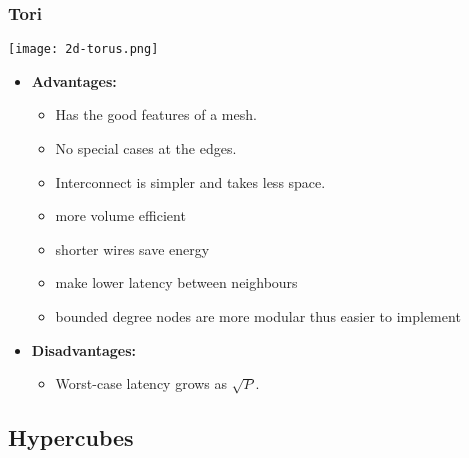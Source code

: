 \documentclass[../main.tex]{subfiles}
\begin{document}
\subsubsection{Tori}

\begin{center}
	\texttt{[image: 2d-torus.png]}
\end{center}
\begin{multicols}{2}
	\begin{itemize}
		\item \textbf{Advantages:}
		      \begin{itemize}
			      \item Has the good features of a mesh.
			      \item No special cases at the edges.
			      \item Interconnect is simpler and takes less space.
			      \item more volume efficient
			      \item shorter wires save energy
			      \item make lower latency between neighbours
			      \item bounded degree nodes are more modular thus easier to implement
		      \end{itemize}
	\end{itemize}

	\begin{itemize}

		\item \textbf{Disadvantages:}
		      \begin{itemize}
			      \item Worst-case latency grows as \(\sqrt{P}\).
		      \end{itemize}
	\end{itemize}
\end{multicols}



\subsection{Hypercubes}
\end{document}
